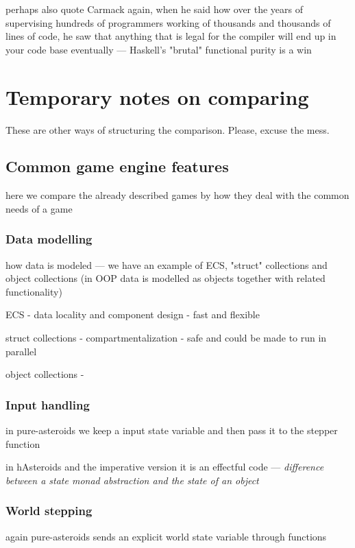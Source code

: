 \documentclass[
  digital, %
  color,   %
  table,   %
  oneside, %
  lof,     %
  lot,     %
]{fithesis3}
\begin{document}
{perhaps also quote Carmack again, when he said how over the years of supervising
hundreds of programmers working of thousands and thousands of lines of code, he saw that
anything that is legal for the compiler will end up in your code base eventually
--- Haskell's "brutal" functional purity is a win



\chapter*{Temporary notes on comparing}

These are other ways of structuring the comparison. Please, excuse the mess.

\section{Common game engine features}
here we compare the already described games by how they
deal with the common needs of a game

\subsection{Data modelling}
how data is modeled --- we have an example of ECS, "struct" collections
and object collections (in OOP data is modelled as objects together with related functionality)

ECS - data locality and component design - fast and flexible

struct collections - compartmentalization - safe and could be made to run in parallel

object collections - 

\subsection{Input handling}

in pure-asteroids we keep a input state variable and then pass it to the stepper function

in hAsteroids and the imperative version it is an effectful code
--- \emph{difference between a state monad abstraction and the state of an object}

\subsection{World stepping}

again pure-asteroids sends an explicit world state variable through functions

}
\end{document}
